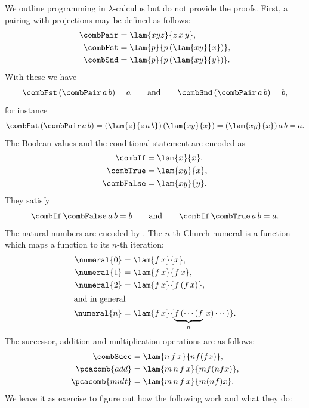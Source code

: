 We outline programming in $\lambda$-calculus but do not provide the proofs. First, a pairing with projections may be defined as follows:
%
\begin{align*}
  \combPair &= \lam{x y z}{z\, x\, y},
  \\
  \combFst &= \lam{p}{p \, (\lam{x y}{x})},
  \\
  \combSnd &= \lam{p}{p \, (\lam{x y}{y})}.
\end{align*}
%
With these we have
%
\begin{equation*}
  \combFst \,(\combPair\, a\, b) = a
  \qquad\text{and}\qquad
  \combSnd \,(\combPair\, a\, b) = b,
\end{equation*}
%
for instance
%
\begin{equation*}
  \combFst \, (\combPair\, a\, b)
   = (\lam{z}{z\, a\, b}) \, (\lam{x y}{x})
   = (\lam{x y}{x}) \, a \, b = a.
\end{equation*}
%
The Boolean values and the conditional statement are encoded as
%
\begin{align*}
  \combIf &= \lam{x}{x},
  \\
  \combTrue &= \lam{x y}{x},
  \\
  \combFalse &= \lam{x y}{y}.
\end{align*}
%
They satisfy
%
\begin{equation*}
  \combIf\,\combFalse\,a\,b = b
  \qquad\text{and}\qquad
  \combIf\,\combTrue\,a\,b = a.
\end{equation*}
%
The natural numbers are encoded by . The $n$-th
Church numeral is a function which maps a function to its $n$-th
iteration:
%
\begin{align*}
  \numeral{0} &= \lam{f\,x}{x},\\
  \numeral{1} &= \lam{f\,x}{f\,x},\\
  \numeral{2} &= \lam{f\,x}{f\,(f\,x)},\\
  \intertext{and in general}
  \numeral{n} &= \lam{f\,x}{\underbrace{f\,(\cdots (f}_n\,x) \cdots)}.
\end{align*}
%
The successor, addition and multiplication operations are as follows:
%
\begin{align*}
  \combSucc &= \lam{n\,f\,x}{n f (f x)},\\
  \pcacomb{add} &= \lam{m\,n\,f\,x}{m f (n f x)},\\
  \pcacomb{mult} &= \lam{m\,n\,f\,x}{m (n f) x}.
\end{align*}
%
We leave it as exercise to figure out how the following work and what
they do:
